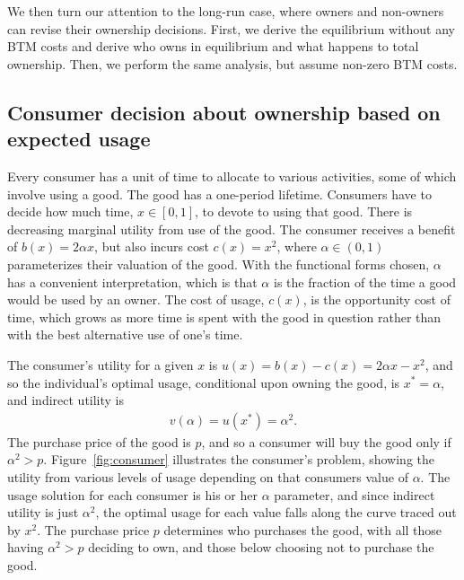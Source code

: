 \documentclass[11pt]{article}
\begin{document}
We then turn our attention to the long-run case, where owners and non-owners can revise their ownership decisions.
First, we derive the equilibrium without any BTM costs and derive who owns in equilibrium and what happens to total ownership.
Then, we perform the same analysis, but assume non-zero BTM costs. 

\subsection{Consumer decision about ownership based on expected usage}  
Every consumer has a unit of time to allocate to various activities, some of which involve using a good.  
The good has a one-period lifetime. 
Consumers have to decide how much time, $x \in [0,1]$, to devote to using that good. 
There is decreasing marginal utility from use of the good.
The consumer receives a benefit of $b(x) = 2\alpha x$, but also incurs cost $c(x) = x^2$,  
where $\alpha \in (0,1)$ parameterizes their valuation of the good.
With the functional forms chosen, $\alpha$ has a convenient interpretation, which is that $\alpha$ is the fraction of the time a good would be used by an owner. 
The cost of usage, $c(x)$, is the opportunity cost of time, which grows as more time is spent with the good in question rather than with the best alternative use of one's time.

The consumer's utility for a given $x$ is $u(x) = b(x) - c(x) = 2 \alpha x - x^2$, and so the individual's optimal usage, conditional upon owning the good, is $x^* = \alpha$, and indirect utility is 
\begin{align}
v(\alpha) = u(x^*) = \alpha^2.  
\end{align} 
The purchase price of the good is $p$, and so a consumer will buy the good only if $\alpha^2 > p$. 
Figure~\ref{fig:consumer} illustrates the consumer's problem, showing the utility from various levels of usage depending on that consumers value of $\alpha$.
The usage solution for each consumer is his or her $\alpha$ parameter, and since indirect utility is just $\alpha^2$, the optimal usage for each value falls along the curve traced out by $x^2$.
The purchase price $p$ determines who purchases the good, with all those having $\alpha^2 > p$ deciding to own, and those below choosing not to purchase the good. 

\pgfmathsetmacro{\xstarOne}{\alphaOne}%
%

\pgfmathsetmacro{\xstarTwo}{\alphaTwo}%
%
\end{document}

